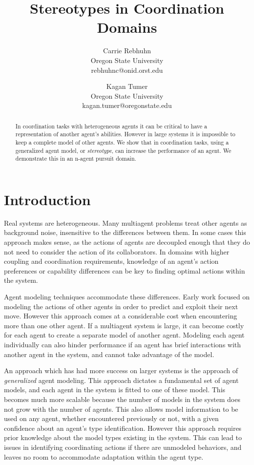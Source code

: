 \documentclass{aamas2014}
\title{Stereotypes in Coordination Domains}
\author{Carrie Rebhuhn \\
Oregon State University \\
rebhuhnc@onid.orst.edu
 \and Kagan Tumer \\
 Oregon State University \\ 
 kagan.tumer@oregonstate.edu
 }
\begin{document}
\maketitle

\begin{abstract}
In coordination tasks with heterogeneous agents it can be critical to have a representation of another agent's abilities. However in large systems it is impossible to keep a complete model of other agents. We show that in coordination tasks, using a generalized agent model, or \emph{stereotype}, can increase the performance of an agent. We demonstrate this in an n-agent pursuit domain.
\end{abstract}

\section{Introduction}

Real systems are heterogeneous. Many multiagent problems treat other agents as background noise, insensitive to the differences between them. In some cases this approach makes sense, as the actions of agents are decoupled enough that they do not need to consider the action of its collaborators. In domains with higher coupling and coordination requirements, knowledge of an agent's action preferences or capability differences can be key to finding optimal actions within the system.


Agent modeling techniques accommodate these differences. Early work focused on modeling the actions of other agents in order to predict and exploit their next move. However this approach comes at a considerable cost when encountering more than one other agent. If a multiagent system is large, it can become costly for each agent to create a separate model of another agent. Modeling each agent individually can also hinder performance if an agent has brief interactions with another agent in the system, and cannot take advantage of the model.

An approach which has had more success on larger systems is the approach of \emph{generalized} agent modeling. This approach dictates a fundamental set of agent models, and each agent in the system is fitted to one of these model. This becomes much more scalable because the number of models in the system does not grow with the number of agents. This also allows model information to be used on any agent, whether encountered previously or not, with a given confidence about an agent's type identification. However this approach requires prior knowledge about the model types existing in the system. This can lead to issues in identifying coordinating actions if there are unmodeled behaviors, and leaves no room to accommodate adaptation within the agent type.
\end{document}

